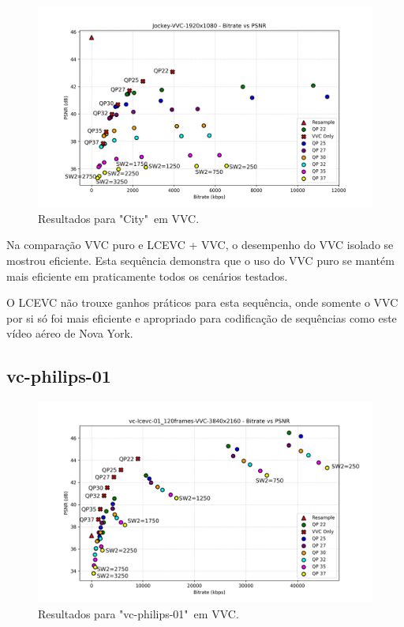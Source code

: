 \begin{figure}[h]
    \centering
    \includegraphics[width=1.0\textwidth]{img/Jockey-VVC.png}
    \caption{Resultados para "City"\ em \acrshort{VVC}. \cite{xiph}}
    \label{fig:City-VVC}
\end{figure}

Na comparação \acrshort{VVC} puro e \acrshort{LCEVC} + \acrshort{VVC}, o desempenho
do \acrshort{VVC} isolado se mostrou eficiente. Esta sequência demonstra que o uso do
\acrshort{VVC} puro se mantém mais eficiente em praticamente todos os cenários testados.

O \acrshort{LCEVC} não trouxe ganhos práticos para esta sequência, onde somente o
\acrshort{VVC} por si só foi mais eficiente e apropriado para codificação de sequências
como este vídeo aéreo de Nova York.

\newpage

\subsection{vc-philips-01}

\begin{figure}[h]
    \centering
    \includegraphics[width=1.0\textwidth]{img/vc-lcevc-01_120frames-VVC.png}
    \caption{Resultados para "vc-philips-01"\ em \acrshort{VVC}.}
    \label{fig:vc-philips-01-VVC}
\end{figure}

